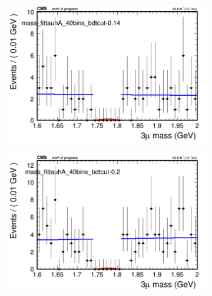 \begin{figure}[H]
\begin{subfigure}{0.2\textwidth}
        \caption{}
    \end{subfigure}
    \begin{subfigure}{0.2\textwidth}
        \includegraphics[width=\textwidth]{unfixed_exp/plots/tauhA/massfit_tauhA_40bins_bdtcut-0.14.png}
        \caption{}
    \end{subfigure}
    \begin{subfigure}{0.2\textwidth}
        \includegraphics[width=\textwidth]{unfixed_exp/plots/tauhA/massfit_tauhA_40bins_bdtcut-0.2.png}
        \caption{}
    \end{subfigure}
    \begin{subfigure}{0.2\textwidth}

\end{subfigure}
\end{figure}
